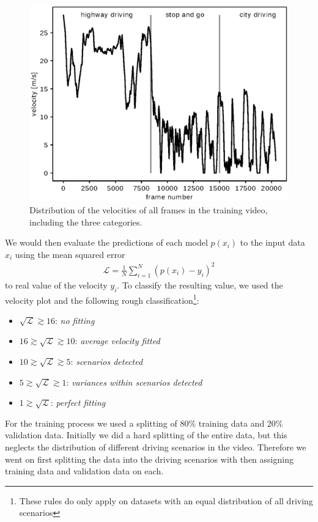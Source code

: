 \documentclass[conference]{IEEEtran}
\begin{document}
\begin{figure}[ht]
	\centering
	\includegraphics[scale=0.55]{./imgs/plot_speed_time_new_splitting.eps}
	\caption{Distribution of the velocities of all frames in the training video, including the three categories.}
	\label{fig:SpeedPerFrameDistributionNewSplitting}
\end{figure}

We would then evaluate the predictions of each model $p(x_i)$ to the input data $x_i$ using the mean squared error
\begin{align}
	\mathcal{L} = \frac{1}{N} \sum\limits_{i=1}^{N} (p(x_i) - y_i)^2
\end{align}
to real value of the velocity $y_i$. To classify the resulting value, we used the velocity plot and the 
following rough classification\footnote{These rules do only apply on datasets with an equal distribution 
of all driving scenarios}: 
\begin{itemize}
\item $\sqrt{\mathcal{L}} \gtrsim 16$: \textit{no fitting}
\item $16 \gtrsim \sqrt{\mathcal{L}} \gtrsim 10$: \emph{average velocity fitted}
\item $10 \gtrsim \sqrt{\mathcal{L}} \gtrsim 5$: \emph{scenarios detected}
\item $5 \gtrsim \sqrt{\mathcal{L}} \gtrsim 1$: \emph{variances within scenarios detected}
\item $1 \gtrsim \sqrt{\mathcal{L}}$: \emph{perfect fitting}
\end{itemize}
For the training process we used a splitting of 80\% training data and 20\% validation data. Initially 
we did a hard splitting of the entire data, but this neglects the distribution of different driving 
scenarios in the video. Therefore we went on first splitting the data into the driving scenarios with 
then assigning training data and validation data on each.
\end{document}
